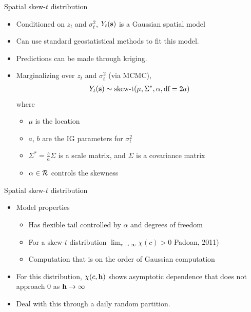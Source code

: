 \documentclass{beamer}
\begin{document}
\begin{frame}{Spatial skew-$t$ distribution}
  \begin{itemize} \setlength{\itemsep}{0.5em}
   \item \alert{Conditioned} on $z_t$ and $\sigma^2_t$, $Y_t(\mbox{\bf s})$ is a Gaussian spatial model
    \item Can use standard geostatistical methods to fit this model.
    \item Predictions can be made through kriging.
    \item \alert{Marginalizing} over $z_t$ and $\sigma^2_t$ (via MCMC),
    \begin{align*}
      Y_t(\mbox{\bf s}) \sim \text{skew-t}(\mu, \Sigma^*, \alpha, \text{df}=2a)
    \end{align*}
    where
    \begin{itemize}
    	\item $\mu$ is the location
	\item $a$, $b$ are the IG parameters for $\sigma^2_t$
	\item $\Sigma^* = \frac{ b }{ a } \Sigma$ is a scale matrix, and $\Sigma$ is a \Matern covariance matrix
	\item $\alpha \in {\cal R}$ controls the skewness
    \end{itemize}

  \end{itemize}
\end{frame}

\begin{frame}{Spatial skew-$t$ distribution}
  \begin{itemize} \setlength{\itemsep}{0.5em}
      \item Model properties
    \begin{itemize}
    	\item Has flexible tail controlled by $\alpha$ and degrees of freedom
    	\item For a skew-$t$ distribution $\lim_{c \rightarrow \infty} \chi(c) > 0$ Padoan, 2011)
    	\item Computation that is on the order of Gaussian computation
    \end{itemize}
    \item For this distribution, $\chi(c, \mbox{\bf h})$ shows asymptotic dependence that does not approach 0 as $\mbox{\bf h} \rightarrow \infty$ 
    \item Deal with this through a daily random partition.
  \end{itemize}
\end{frame}
\end{document}
